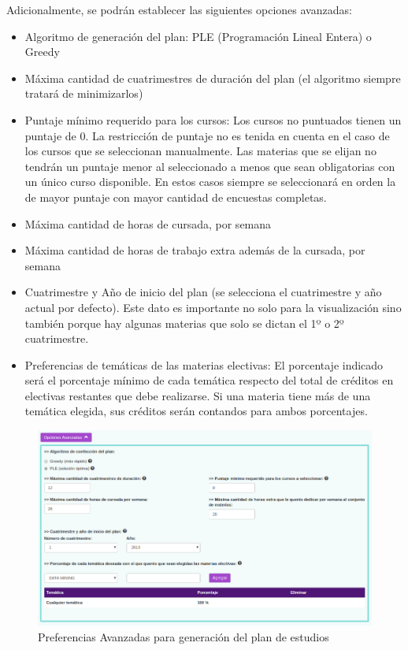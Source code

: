 \documentclass[a4paper]{article}
\begin{document}
Adicionalmente, se podrán establecer las siguientes opciones avanzadas:

\begin{itemize}
	\item Algoritmo de generación del plan: PLE (Programación Lineal Entera) o Greedy
	\item Máxima cantidad de cuatrimestres de duración del plan (el algoritmo siempre tratará de minimizarlos)
	\item Puntaje mínimo requerido para los cursos: Los cursos no puntuados tienen un puntaje de 0. La restricción de puntaje no es tenida en cuenta en el caso de los cursos que se seleccionan manualmente. Las materias que se elijan no tendrán un puntaje menor al seleccionado a menos que sean obligatorias con un único curso disponible. En estos casos siempre se seleccionará en orden la de mayor puntaje con mayor cantidad de encuestas completas.
	\item Máxima cantidad de horas de cursada, por semana
	\item Máxima cantidad de horas de trabajo extra además de la cursada, por semana
	\item Cuatrimestre y Año de inicio del plan (se selecciona el cuatrimestre y año actual por defecto). Este dato es importante no solo para la visualización sino también porque hay algunas materias que solo se dictan el 1º o 2º cuatrimestre.
	\item Preferencias de temáticas de las materias electivas: El porcentaje indicado será el porcentaje mínimo de cada temática respecto del total de créditos en electivas restantes que debe realizarse. Si una materia tiene más de una temática elegida, sus créditos serán contandos para ambos porcentajes.
\end{itemize}

\begin{figure}[H]
\centering
\includegraphics[scale=0.35]{Imagenes/preferencias_avanzadas_generacion_plan.png}\par
\caption{Preferencias Avanzadas para generación del plan de estudios}
\end{figure}
\end{document}
